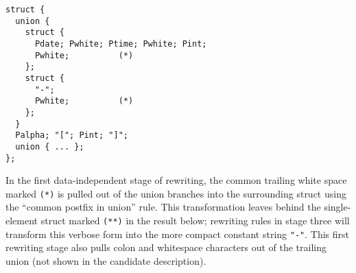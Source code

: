 {\small
\begin{verbatim}
struct {
  union {
    struct {
      Pdate; Pwhite; Ptime; Pwhite; Pint;  
      Pwhite;          (*)
    };
    struct { 
      "-"; 
      Pwhite;          (*)
    };
  }
  Palpha; "["; Pint; "]";
  union { ... };
};
\end{verbatim}
}





\noindent
In the first data-independent stage of rewriting, 
the common trailing white space marked {\tt (*)} is
pulled out of the union branches into the surrounding
struct using the ``common postfix in union'' rule.  
This transformation leaves behind the single-element struct marked
{\tt (**)} in the result below; rewriting 
rules in stage 
three will transform this verbose form into the more compact constant 
string {\tt "-"}.  This first rewriting
stage also pulls colon and whitespace characters out of the 
trailing union (not shown in the candidate description).

